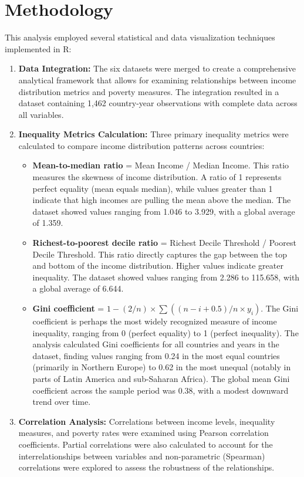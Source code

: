 \documentclass[12pt,a4paper]{article}
\begin{document}
\section{Methodology}\label{sec:methodology}
This analysis employed several statistical and data visualization techniques implemented in R:
\begin{enumerate}
    \item \textbf{Data Integration:} The six datasets were merged to create a comprehensive analytical framework that allows for examining relationships between income distribution metrics and poverty measures. The integration resulted in a dataset containing 1,462 country-year observations with complete data across all variables.
    \item \textbf{Inequality Metrics Calculation:} Three primary inequality metrics were calculated to compare income distribution patterns across countries: 
    \begin{itemize}
        \item \textbf{Mean-to-median ratio} = Mean Income / Median Income. This ratio measures the skewness of income distribution. A ratio of 1 represents perfect equality (mean equals median), while values greater than 1 indicate that high incomes are pulling the mean above the median. The dataset showed values ranging from 1.046 to 3.929, with a global average of 1.359.
        \item \textbf{Richest-to-poorest decile ratio} = Richest Decile Threshold / Poorest Decile Threshold. This ratio directly captures the gap between the top and bottom of the income distribution. Higher values indicate greater inequality. The dataset showed values ranging from 2.286 to 115.658, with a global average of 6.644.
        \item \textbf{Gini coefficient} = $1 - (2/n) \times \sum((n-i+0.5)/n \times y_i)$. The Gini coefficient is perhaps the most widely recognized measure of income inequality, ranging from 0 (perfect equality) to 1 (perfect inequality). The analysis calculated Gini coefficients for all countries and years in the dataset, finding values ranging from 0.24 in the most equal countries (primarily in Northern Europe) to 0.62 in the most unequal (notably in parts of Latin America and sub-Saharan Africa). The global mean Gini coefficient across the sample period was 0.38, with a modest downward trend over time.
    \end{itemize}
    \item \textbf{Correlation Analysis:} Correlations between income levels, inequality measures, and poverty rates were examined using Pearson correlation coefficients. Partial correlations were also calculated to account for the interrelationships between variables and non-parametric (Spearman) correlations were explored to assess the robustness of the relationships.

\end{enumerate}
\end{document}
